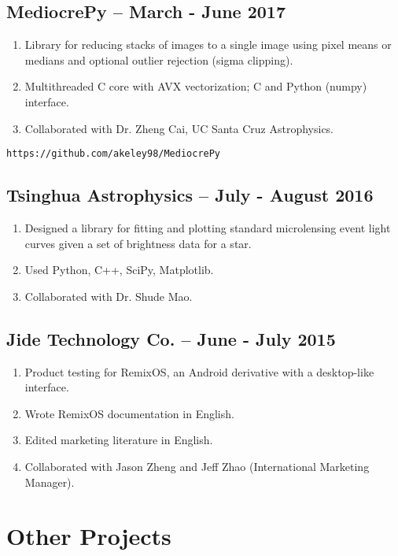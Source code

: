\documentclass[11pt]{article}
\begin{document}
\subsection{MediocrePy -- March - June 2017}
\begin{enumerate}
\item Library for reducing stacks of images to a single image using pixel
means or medians and optional outlier rejection (sigma clipping).
\item Multithreaded C core with AVX vectorization; C and Python (numpy)
  interface.
\item Collaborated with Dr. Zheng Cai, UC Santa Cruz Astrophysics.
\end{enumerate}
\texttt{https://github.com/akeley98/MediocrePy}

\subsection{Tsinghua Astrophysics -- July - August 2016}
\begin{enumerate}
\item Designed a library for fitting and plotting standard
  microlensing event light curves given a set of brightness
  data for a star.
\item Used Python, C++, SciPy, Matplotlib.
\item Collaborated with Dr. Shude Mao.
\end{enumerate}

\subsection{Jide Technology Co. -- June - July 2015}
\begin{enumerate}
\item Product testing for RemixOS, an Android derivative with a
  desktop-like interface.

\item Wrote RemixOS documentation in English.

\item Edited marketing literature in English.

\item Collaborated with Jason Zheng and Jeff Zhao (International
  Marketing Manager).
\end{enumerate}

\section{Other Projects}
\end{document}
